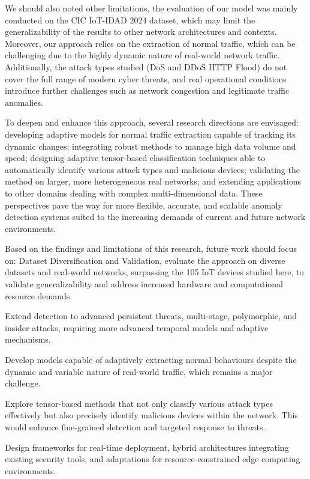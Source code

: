 \documentclass[pdflatex,sn-mathphys-num]{sn-jnl}
\theoremstyle{thmstyleone}
\theoremstyle{thmstyletwo}
\theoremstyle{thmstylethree}
\begin{document}
We should also noted other limitations, the evaluation of our model was mainly conducted on the CIC IoT-IDAD 2024 dataset, which may limit the generalizability of the results to other network architectures and contexts. Moreover, our approach relies on the extraction of normal traffic, which can be challenging due to the highly dynamic nature of real-world network traffic. Additionally, the attack types studied (DoS and DDoS HTTP Flood) do not cover the full range of modern cyber threats, and real operational conditions introduce further challenges such as network congestion and legitimate traffic anomalies.

To deepen and enhance this approach, several research directions are envisaged: developing adaptive models for normal traffic extraction capable of tracking its dynamic changes; integrating robust methods to manage high data volume and speed; designing adaptive tensor-based classification techniques able to automatically identify various attack types and malicious devices; validating the method on larger, more heterogeneous real networks; and extending applications to other domains dealing with complex multi-dimensional data. These perspectives pave the way for more flexible, accurate, and scalable anomaly detection systems suited to the increasing demands of current and future network environments.

Based on the findings and limitations of this research, future work should focus on: Dataset Diversification and Validation, evaluate the approach on diverse datasets and real-world networks, surpassing the 105 IoT devices studied here, to validate generalizability and address increased hardware and computational resource demands.

\noindent Extend detection to advanced persistent threats, multi-stage, polymorphic, and insider attacks, requiring more advanced temporal models and adaptive mechanisms.
   
\noindent Develop models capable of adaptively extracting normal behaviours despite the dynamic and variable nature of real-world traffic, which remains a major challenge.
    

\noindent Explore tensor-based methods that not only classify various attack types effectively but also precisely identify malicious devices within the network. This would enhance fine-grained detection and targeted response to threats.
    
\noindent Design frameworks for real-time deployment, hybrid architectures integrating existing security tools, and adaptations for resource-constrained edge computing environments.
    
\end{document}
